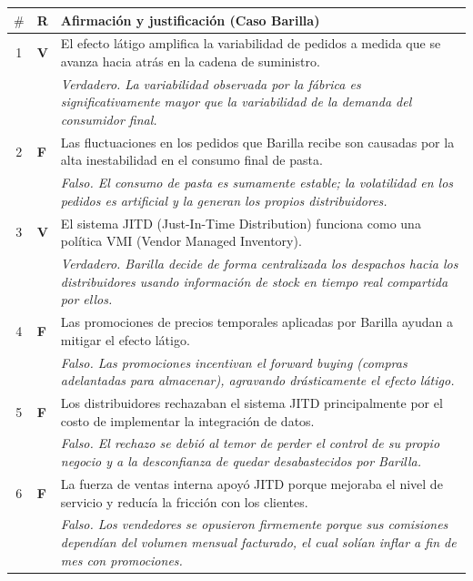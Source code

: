 \begin{center}
\small
\begin{tabular}{@{}clp{11cm}@{}}
  \toprule
  $\#$ & R & Afirmación y justificación (Caso Barilla) \\
  \midrule
  1 & \textbf{V} & El efecto látigo amplifica la variabilidad de pedidos a medida que se avanza hacia atrás en la cadena de suministro. \\
    &            & \textit{Verdadero. La variabilidad observada por la fábrica es significativamente mayor que la variabilidad de la demanda del consumidor final.} \\
  2 & \textbf{F} & Las fluctuaciones en los pedidos que Barilla recibe son causadas por la alta inestabilidad en el consumo final de pasta. \\
    &            & \textit{Falso. El consumo de pasta es sumamente estable; la volatilidad en los pedidos es artificial y la generan los propios distribuidores.} \\
  3 & \textbf{V} & El sistema JITD (Just-In-Time Distribution) funciona como una política VMI (Vendor Managed Inventory). \\
    &            & \textit{Verdadero. Barilla decide de forma centralizada los despachos hacia los distribuidores usando información de stock en tiempo real compartida por ellos.} \\
  4 & \textbf{F} & Las promociones de precios temporales aplicadas por Barilla ayudan a mitigar el efecto látigo. \\
    &            & \textit{Falso. Las promociones incentivan el forward buying (compras adelantadas para almacenar), agravando drásticamente el efecto látigo.} \\
  5 & \textbf{F} & Los distribuidores rechazaban el sistema JITD principalmente por el costo de implementar la integración de datos. \\
    &            & \textit{Falso. El rechazo se debió al temor de perder el control de su propio negocio y a la desconfianza de quedar desabastecidos por Barilla.} \\
  6 & \textbf{F} & La fuerza de ventas interna apoyó JITD porque mejoraba el nivel de servicio y reducía la fricción con los clientes. \\
    &            & \textit{Falso. Los vendedores se opusieron firmemente porque sus comisiones dependían del volumen mensual facturado, el cual solían inflar a fin de mes con promociones.} \\
  \bottomrule
\end{tabular}
\end{center}

